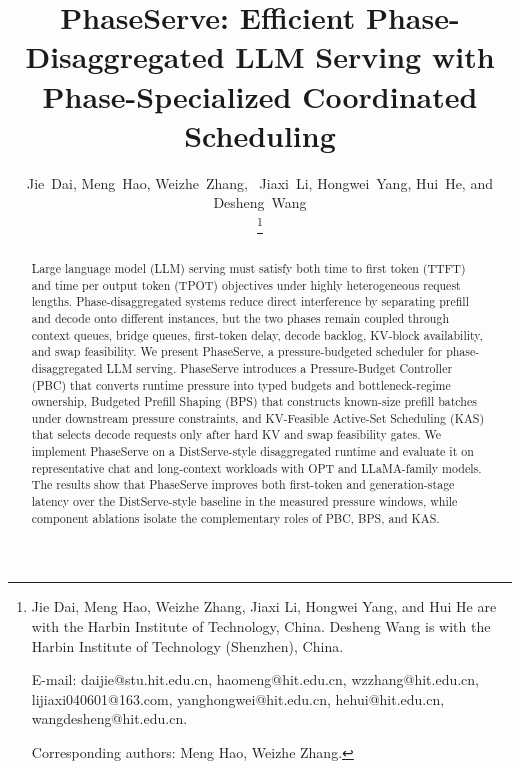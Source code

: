 \documentclass[lettersize,journal]{IEEEtran}
\begin{document}
\title{PhaseServe: Efficient Phase-Disaggregated LLM Serving with Phase-Specialized Coordinated Scheduling}

\author{Jie~Dai,
        Meng~Hao,
        Weizhe~Zhang,~
        Jiaxi~Li,
        Hongwei~Yang,
        Hui~He,
        and Desheng~Wang%

\thanks{Jie Dai, Meng Hao, Weizhe Zhang, Jiaxi Li, Hongwei Yang, and Hui He are with the Harbin Institute of Technology, China. Desheng Wang is with the Harbin Institute of Technology (Shenzhen), China.
	
	E-mail: daijie@stu.hit.edu.cn, haomeng@hit.edu.cn, 
    wzzhang@hit.edu.cn,
    lijiaxi040601@163.com,
    yanghongwei@hit.edu.cn,
    hehui@hit.edu.cn,
    wangdesheng@hit.edu.cn.

    Corresponding authors: Meng Hao, Weizhe Zhang.
    }
}




\maketitle

\begin{abstract}
Large language model (LLM) serving must satisfy both time to first token (TTFT) and time per output token (TPOT) objectives under highly heterogeneous request lengths. Phase-disaggregated systems reduce direct interference by separating prefill and decode onto different instances, but the two phases remain coupled through context queues, bridge queues, first-token delay, decode backlog, KV-block availability, and swap feasibility. We present PhaseServe, a pressure-budgeted scheduler for phase-disaggregated LLM serving. PhaseServe introduces a Pressure-Budget Controller (PBC) that converts runtime pressure into typed budgets and bottleneck-regime ownership, Budgeted Prefill Shaping (BPS) that constructs known-size prefill batches under downstream pressure constraints, and KV-Feasible Active-Set Scheduling (KAS) that selects decode requests only after hard KV and swap feasibility gates. We implement PhaseServe on a DistServe-style disaggregated runtime and evaluate it on representative chat and long-context workloads with OPT and LLaMA-family models. The results show that PhaseServe improves both first-token and generation-stage latency over the DistServe-style baseline in the measured pressure windows, while component ablations isolate the complementary roles of PBC, BPS, and KAS.
\end{abstract}
\end{document}
